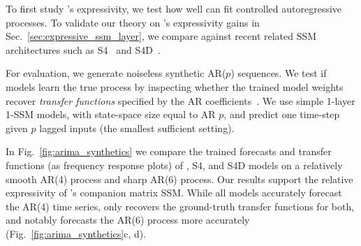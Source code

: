 To first study \ourmethod{}'s expressivity, we test how well \ourmethod{} can fit controlled autoregressive processes. 
%
To validate our theory on \ourmethod{}'s expressivity gains in Sec.~\ref{sec:expressive_ssm_layer}, we compare against recent related SSM architectures such as S4~\citep{gu2021efficiently} and S4D~\citep{gu2022parameterization}. 

For evaluation, we generate noiseless synthetic AR($p$) sequences. 
We test if models learn the true process by inspecting whether the trained model weights recover \emph{transfer functions} specified by the AR coefficients~\citep{oppenheim1999discrete}. 
We use simple 1-layer 1-SSM models, with state-space size equal to AR $p$, and predict one time-step given $p$ lagged inputs (the smallest sufficient setting).

In Fig.~\ref{fig:arima_synthetics} we compare the trained forecasts and transfer functions (as frequency response plots) of \ourmethod{}, S4, and S4D models on a relatively smooth AR(4) process and sharp AR(6) process. Our results support the relative expressivity of \ourmethod{}'s companion matrix SSM. While all models accurately forecast the AR(4) time series, only \ourmethod{} recovers the ground-truth transfer functions for both, and notably forecasts the AR(6) process more accurately (Fig.~\ref{fig:arima_synthetics}c, d). 


